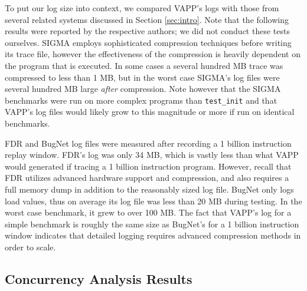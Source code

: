To put our log size into context, we compared VAPP's logs with those
from several related systems discussed in Section \ref{sec:intro}.
Note that the following results were reported by the respective authors;
we did not conduct these tests ourselves.
SIGMA employs sophisticated compression techniques before writing
its trace file, however the effectiveness of the compression is
heavily dependent on the program that is executed.  In some cases
a several hundred MB trace was compressed to less than 1 MB,
but in the worst case SIGMA's log files were several hundred MB
large \emph{after} compression.  Note however that the SIGMA benchmarks
were run on more complex programs than \texttt{test\_init} and that
VAPP's log files would likely grow to this magnitude or more if
run on identical benchmarks.

FDR and BugNet log files were measured after recording a 1 billion
instruction replay window.  FDR's log was only 34 MB, which is vastly
less than what VAPP would generated if tracing a 1 billion instruction
program.  However, recall that FDR utilizes advanced hardware support and
compression, and also requires a full memory dump in addition to the
reasonably sized log file.  BugNet only logs load values, thus on average
its log file was less than 20 MB during testing.  In the worst case
benchmark, it grew to over 100 MB.  The fact that VAPP's log for a
simple benchmark is roughly the same size as BugNet's for a 1 billion
instruction window indicates that detailed logging requires advanced
compression methods in order to scale.


\subsection{Concurrency Analysis Results}

  


